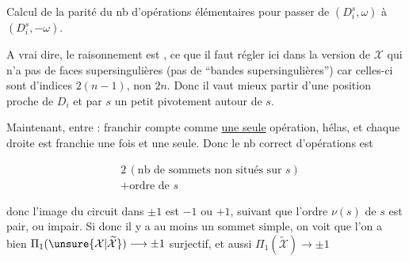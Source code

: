 Calcul de la parité du nb d'opérations élémentaires pour passer de $(D_i^{s},\omega)$ à $(D_i^{s},-\omega)$.





A vrai dire, le raisonnement est ,  ce que il faut régler ici dans la version de $\mathcal X$ qui n'a pas de faces supersingulières (pas de ``bandes supersingulières'') car celles-ci sont d'indices $2(n-1)$, non $2n$. Donc il vaut mieux partir d'une position proche de $D_i$  et par $s$  un petit pivotement autour de $s$.

Maintenant,  entre : franchir compte comme \uline{une seule} opération, hélas, et chaque droite   est franchie une fois et une seule. Donc le nb correct d'opérations est

\[ \begin{aligned}
&2\,(\text{nb de sommets non situés sur }s)\\
&+\text{ordre de }s
\end{aligned} \]

donc l'image du circuit dans $\pm1$ est $-1$ ou $+1$, suivant que l'ordre  $\nu(s)$ de $s$ est pair, ou impair. Si donc il y a au moins un sommet simple, on voit que l'on a bien $\Pi_1(\unsure{\mathcal X|\widetilde{\mathcal X}})\longrightarrow\pm1$ surjectif, et aussi $\Pi_1(\widetilde{\mathcal X})\longrightarrow\pm1$ 

